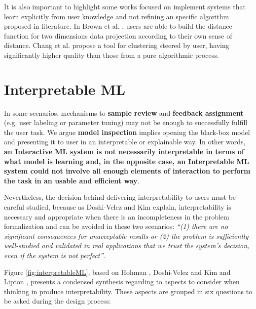 It is also important to highlight some works focused on implement systems that learn explicitly from user knowledge and not refining an specific algorithm proposed in literature. In Brown et al. \cite{Brown2012Dis-function:Interactively}, users are able to build the distance function for two dimensions data projection according to their own sense of distance. Chang et al. \cite{Chang2016AppGrouper:Results} propose a tool for clustering steered by user, having significantly higher quality than those from a pure algorithmic process.

\section{Interpretable ML} %
\label{section2.2}

In some scenarios, mechanisms to \textbf{sample review} and \textbf{feedback assignment} (e.g. user labeling or parameter tuning) may not be enough to successfully fulfill the user task. We argue \textbf{model inspection} implies opening the black-box model and presenting it to user in an interpretable or explainable way. In other words, \textbf{an Interactive ML system is not necessarily interpretable in terms of what model is learning and, in the opposite case, an Interpretable ML system could not involve all enough elements of interaction to perform the task in an usable and efficient way}. 

Nevertheless, the decision behind delivering interpretability to users must be careful studied, because as Doshi-Velez and Kim \cite{Doshi-Velez2017c} explain, interpretability is necessary and appropriate when there is an incompleteness in the problem formalization and can be avoided in these two scenarios: \textit{``(1) there are no significant consequences for unacceptable results or (2) the problem is sufficiently well-studied and validated in real applications that we trust the system’s decision, even if the system is not perfect''}.

Figure \ref{fig:interpretableML}, based on Hohman \cite{Hohman2018VisualFrontiers}, Doshi-Velez and Kim \cite{Doshi-Velez2017c} and Lipton \cite{Lipton2017TheInterpretability}, presents a condensed synthesis regarding to aspects to consider when thinking in produce interpretability. These aspects are grouped in six questions to be asked during the design process:

